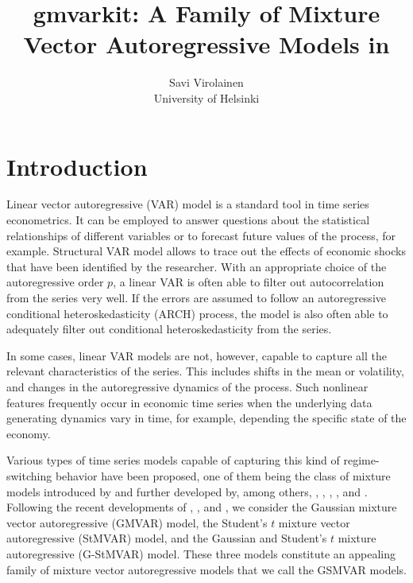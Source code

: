 \documentclass[nojss]{jss}
\author{Savi Virolainen\\ University of Helsinki}
\title{gmvarkit: A Family of Mixture Vector Autoregressive Models in \proglang{R}}
\makeatletter
\def\tableofcontents{%
  \section*{\contentsname}%
  \@starttoc{toc}%
}
\makeatother
\begin{document}
\pagebreak
\tableofcontents
\vfill
\pagebreak
{}

\section{Introduction}


Linear vector autoregressive (VAR) model is a standard tool in time series econometrics. It can be employed to answer questions about the statistical relationships of different variables or to forecast future values of the process, for example. Structural VAR model allows to trace out the effects of economic shocks that have been identified by the researcher. With an appropriate choice of the autoregressive order $p$, a linear VAR is often able to filter out autocorrelation from the series very well. If the errors are assumed to follow an autoregressive conditional heteroskedasticity (ARCH) process, the model is also often able to adequately filter out conditional heteroskedasticity from the series.

In some cases, linear VAR models are not, however, capable to capture all the relevant characteristics of the series. This includes shifts in the mean or volatility, and changes in the autoregressive dynamics of the process. Such nonlinear features frequently occur in economic time series when the underlying data generating dynamics vary in time, for example, depending the specific state of the economy.

Various types of time series models capable of capturing this kind of regime-switching behavior have been proposed, one of them being the class of mixture models introduced by \cite{Le+Martin+Raftery:1996} and further developed by, among others, \cite{Kalliovirta+Meitz+Saikkonen:2015}, \cite{Kalliovirta+Meitz+Saikkonen:2015}, \cite{Meitz+Preve+Saikkonen:2021}, \cite{Virolainen:2025}, and \cite{Virolainen:2021, Virolainen2:2021}. Following the recent developments of \cite{Kalliovirta+Meitz+Saikkonen:2016}, \cite{Virolainen:2025}, and \cite{Virolainen2:2021}, we consider the Gaussian mixture vector autoregressive (GMVAR) model, the Student's $t$ mixture vector autoregressive (StMVAR) model, and the Gaussian and Student's $t$ mixture autoregressive (G-StMVAR) model. These three models constitute an appealing family of mixture vector autoregressive models that we call the GSMVAR models.
\end{document}
